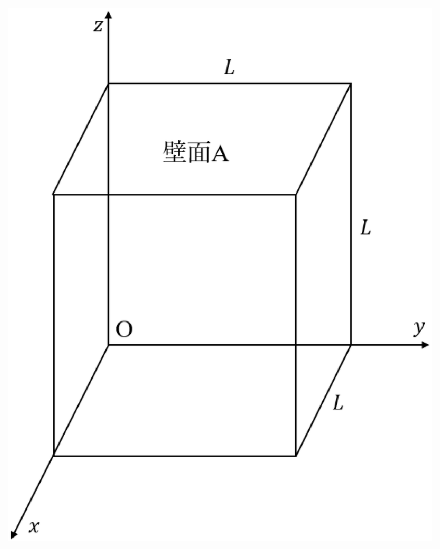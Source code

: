 \begin{figure}[H]
  \centering
  \begin{minipage}{.3\columnwidth}
    \includegraphics[width=\columnwidth]{../graphs/jumon_65_1.eps}
    \caption{}
  \end{minipage}
  \begin{minipage}{.3\columnwidth}
    \centering

\end{minipage}
\end{figure}
